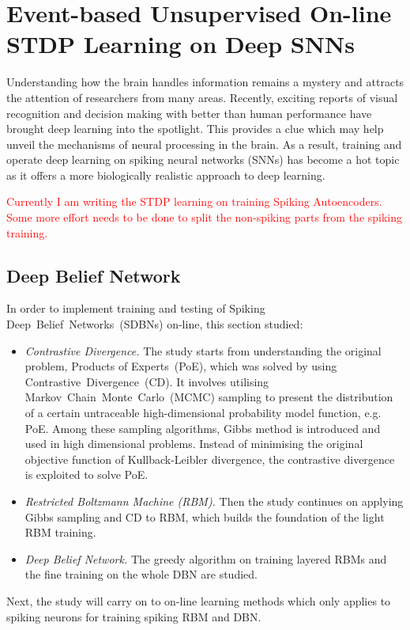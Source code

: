\chapter{Event-based Unsupervised On-line STDP Learning on Deep SNNs}
\label{cha:sdbn}
Understanding how the brain handles information remains a mystery and attracts the attention of researchers from many areas.
Recently, exciting reports of visual recognition and decision making with better than human performance have brought deep learning into the spotlight.
This provides a clue which may help unveil the mechanisms of neural processing in the brain.
As a result, training and operate deep learning on spiking neural networks (SNNs) has become a hot topic as it offers a more biologically realistic approach to deep learning.

\textcolor{red}{Currently I am writing the STDP learning on training Spiking Autoencoders. Some more effort needs to be done to split the non-spiking parts from the spiking training. }

\section{Deep Belief Network}
	In order to implement training and testing of Spiking Deep~Belief~Networks~(SDBNs) on-line, this section studied:
	\begin{itemize}
		\item \textit{Contrastive Divergence.}
		The study starts from understanding the original problem, Products of Experts~(PoE), which was solved by using Contrastive~Divergence~(CD).
		It involves utilising Markov~Chain~Monte~Carlo~(MCMC) sampling to present the distribution of a certain untraceable high-dimensional probability model function, e.g. PoE.
		Among these sampling algorithms, Gibbs method is introduced and used in high dimensional problems.
		Instead of minimising the original objective function of Kullback-Leibler divergence, the contrastive divergence is exploited to solve PoE.
		\item \textit{Restricted Boltzmann Machine (RBM). }
		Then the study continues on applying Gibbs sampling and CD to RBM, which builds the foundation of the light RBM training.
		\item \textit{Deep Belief Network.} 
		The greedy algorithm on training layered RBMs and the fine training on the whole DBN are studied.
	\end{itemize}
	Next, the study will carry on to on-line learning methods which only applies to spiking neurons for training spiking RBM and DBN.
